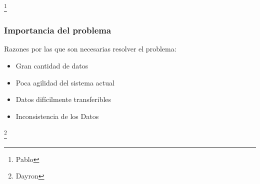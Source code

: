 \documentclass[14pt]{beamer}
\begin{document}
\begin{frame}
\begin{columns}
\begin{column}{0.5\textwidth}
\begin{center}

\end{center}
\end{column}
\end{columns}




\footnote{Pablo}
\end{frame}


\begin{frame}
\frametitle{Importancia del problema}
Razones por las que son necesarias resolver el problema:
\begin{itemize}
\item Gran cantidad de datos
\item Poca agilidad del sistema actual
\item Datos difícilmente transferibles
\item Inconsistencia de los Datos
\end{itemize}
\footnote{Dayron}
\end{frame}
\end{document}
